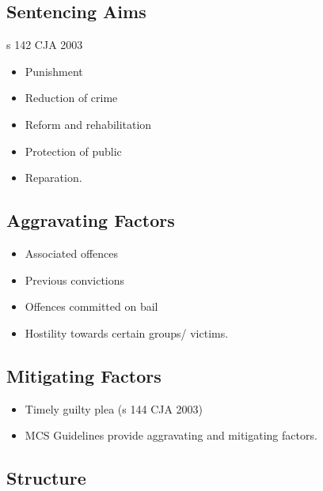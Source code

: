 \documentclass[
]{article}
\providecommand{\tightlist}{%
  \setlength{\itemsep}{0pt}\setlength{\parskip}{0pt}}
\begin{document}
\hypertarget{sentencing-aims}{%
\subsection{Sentencing Aims}\label{sentencing-aims}}

s 142 CJA 2003

\begin{itemize}
\tightlist
\item
  Punishment
\item
  Reduction of crime
\item
  Reform and rehabilitation
\item
  Protection of public
\item
  Reparation.
\end{itemize}

\hypertarget{aggravating-factors}{%
\subsection{Aggravating Factors}\label{aggravating-factors}}

\begin{itemize}
\tightlist
\item
  Associated offences
\item
  Previous convictions
\item
  Offences committed on bail
\item
  Hostility towards certain groups/ victims.
\end{itemize}

\hypertarget{mitigating-factors}{%
\subsection{Mitigating Factors}\label{mitigating-factors}}

\begin{itemize}
\tightlist
\item
  Timely guilty plea (s 144 CJA 2003)
\item
  MCS Guidelines provide aggravating and mitigating factors.
\end{itemize}

\hypertarget{structure}{%
\subsection{Structure}\label{structure}}
\end{document}
